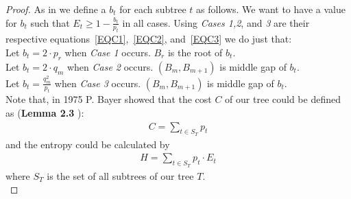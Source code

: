 \documentclass[letterpaper,12pt,titlepage,oneside,final]{book}
\theoremstyle{plain}
\begin{document}
\begin{proof}
As in \cite{bayer1975improved} we define a $b_t$ for each subtree $t$ as follows. We want to have a value for $b_t$ such that $E_t \geq 1 - \frac{b_t}{p_t}$ in all cases. Using \textit{Cases 1,2}, and \textit{3} are their respective equations~\ref{EQC1},~\ref{EQC2}, and~\ref{EQC3} we do just that: \\
Let $b_t=2\cdot p_r$ when \textit{Case 1} occurs. $B_r$ is the root of $b_t$. \\
Let $b_t=2\cdot q_m$ when \textit{Case 2} occurs. $(B_m, B_{m+1})$ is middle gap of $b_t$. \\
Let $b_t=\frac{q_m^2}{p_t}$ when \textit{Case 3} occurs. $(B_m, B_{m+1})$ is middle gap of $b_t$. \\


Note that, in 1975 P. Bayer showed that the cost $C$ of our tree could be defined as (\textbf{Lemma 2.3} \cite{bayer1975improved}): \\
\begin{align*}
C = \sum_{t \in S_T} p_t
\end{align*}
and the entropy could be calculated by
\begin{align*}
H = \sum_{t \in S_T} p_t \cdot E_t
\end{align*}  
where $S_T$ is the set of all subtrees of our tree $T$. \\


\end{proof}
\end{document}
